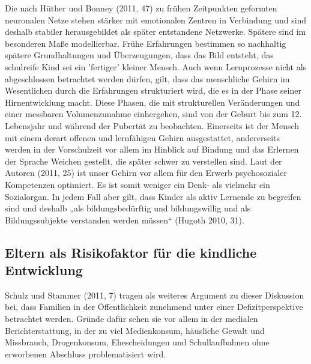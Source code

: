 Die nach Hüther und Bonney (2011, 47) zu frühen Zeitpunkten geformten neuronalen Netze stehen stärker mit emotionalen Zentren in Verbindung und sind deshalb stabiler herausgebildet als später entstandene Netzwerke. Spätere sind im besonderen Maße modellierbar.
Frühe Erfahrungen bestimmen so nachhaltig spätere Grundhaltungen und Überzeugungen, dass das Bild entsteht, das schulreife Kind sei ein ’fertiger' kleiner Mensch. Auch wenn Lernprozesse nicht als abgeschlossen betrachtet werden dürfen, gilt, dass das menschliche Gehirn im Wesentlichen durch die Erfahrungen strukturiert wird, die es in der Phase seiner Hirnentwicklung macht. 
Diese Phasen, die mit strukturellen Veränderungen und einer messbaren Volumenzunahme einhergehen, sind von der Geburt bis zum 12. Lebensjahr und während der Pubertät zu beobachten. 
Einerseits ist der Mensch mit einem derart offenen und lernfähigen Gehirn ausgestattet, andererseits werden in der Vorschulzeit vor allem im Hinblick auf Bindung und das Erlernen der Sprache Weichen gestellt, die später schwer zu verstellen sind. Laut der Autoren  (2011, 25) ist unser Gehirn vor allem für den Erwerb psychosozialer Kompetenzen optimiert. Es ist somit weniger ein Denk- als vielmehr ein Sozialorgan.  
In jedem Fall aber gilt, dass Kinder als aktiv Lernende zu begreifen sind und deshalb „als bildungsbedürftig und bildungswillig und als Bildungssubjekte verstanden werden müssen“ (Hugoth 2010, 31).
 
\subsection{Eltern als Risikofaktor für die kindliche Entwicklung}\label{sec:Risikofaktoren}
Schulz und Stammer (2011, 7) tragen als weiteres Argument zu dieser Diskussion bei, dass Familien in der Öffentlichkeit zunehmend unter einer Defizitperspektive betrachtet werden. Gründe dafür sehen sie vor allem in der medialen Berichterstattung, in der zu viel Medienkonsum, häusliche Gewalt und Missbrauch, Drogenkonsum, Ehescheidungen und  Schullaufbahnen ohne erworbenen Abschluss problematisiert wird. 

